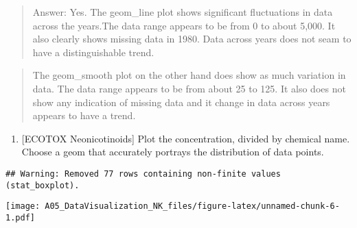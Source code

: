 \documentclass[]{article}
\newenvironment{Shaded}{\begin{snugshade}}{\end{snugshade}}
\newcommand{\KeywordTok}[1]{\textcolor[rgb]{0.13,0.29,0.53}{\textbf{#1}}}
\newcommand{\DataTypeTok}[1]{\textcolor[rgb]{0.13,0.29,0.53}{#1}}
\newcommand{\DecValTok}[1]{\textcolor[rgb]{0.00,0.00,0.81}{#1}}
\newcommand{\StringTok}[1]{\textcolor[rgb]{0.31,0.60,0.02}{#1}}
\newcommand{\CommentTok}[1]{\textcolor[rgb]{0.56,0.35,0.01}{\textit{#1}}}
\newcommand{\OperatorTok}[1]{\textcolor[rgb]{0.81,0.36,0.00}{\textbf{#1}}}
\newcommand{\NormalTok}[1]{#1}
\providecommand{\tightlist}{%
  \setlength{\itemsep}{0pt}\setlength{\parskip}{0pt}}
\begin{document}
\begin{quote}
Answer: Yes. The geom\_line plot shows significant fluctuations in data
across the years.The data range appears to be from 0 to about 5,000. It
also clearly shows missing data in 1980. Data across years does not seam
to have a distinguishable trend.
\end{quote}

\begin{quote}
The geom\_smooth plot on the other hand does show as much variation in
data. The data range appears to be from about 25 to 125. It also does
not show any indication of missing data and it change in data across
years appears to have a trend.
\end{quote}

\begin{enumerate}
\def\labelenumi{\arabic{enumi}.}
\setcounter{enumi}{6}
\tightlist
\item
  {[}ECOTOX Neonicotinoids{]} Plot the concentration, divided by
  chemical name. Choose a geom that accurately portrays the distribution
  of data points.
\end{enumerate}

\begin{Shaded}
\end{Shaded}

\begin{verbatim}
## Warning: Removed 77 rows containing non-finite values (stat_boxplot).
\end{verbatim}

\texttt{[image: A05\_DataVisualization\_NK\_files/figure-latex/unnamed-chunk-6-1.pdf]}
\end{document}
